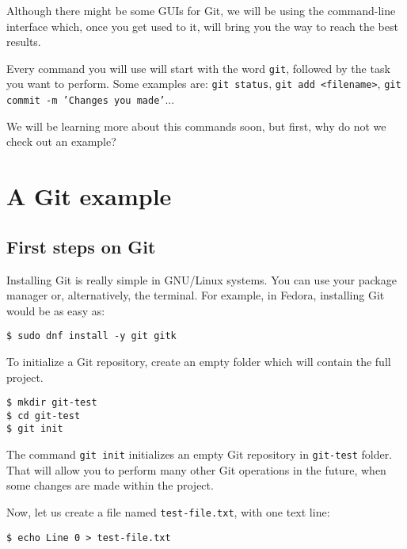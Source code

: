 \documentclass[a4paper,10pt]{article}
\newenvironment{terminal}
  {
    \vspace{+10pt}
    \begin{center}
    \begin{minipage}{0.95\textwidth}
    \begin{framed}
  }
  {
    \end{framed}
    \end{minipage}
    \end{center}
    \vspace{+10pt}
  }
\begin{document}
Although there might be some GUIs for Git, we will be using the command-line
interface which, once you get used to it, will bring you the way to reach the
best results.

Every command you will use will start with the word \texttt{git}, followed
by the task you want to perform. Some examples are:
\texttt{git status},
\texttt{git add <filename>},
\texttt{git commit -m 'Changes you made'}...

We will be learning more about this commands soon, but first, why do not we
check out an example?

\section{A Git example}

\subsection{First steps on Git}

Installing Git is really simple in GNU/Linux systems. You can use your
package manager or, alternatively, the terminal. For example, in
Fedora, installing Git would be as easy as:

\begin{terminal}
\begin{verbatim}
$ sudo dnf install -y git gitk
\end{verbatim}
\end{terminal}

To initialize a Git repository, create an empty folder which will
contain the full project.

\begin{terminal}
\begin{verbatim}
$ mkdir git-test
$ cd git-test
$ git init
\end{verbatim}
\end{terminal}

The command \texttt{git init} initializes an empty Git repository in
\texttt{git-test} folder. That will allow you to perform many other Git
operations in the future, when some changes are made within the project.

Now, let us create a file named \texttt{test-file.txt}, with one text
line:

\begin{terminal}
\begin{verbatim}
$ echo Line 0 > test-file.txt
\end{verbatim}
\end{terminal}
\end{document}
